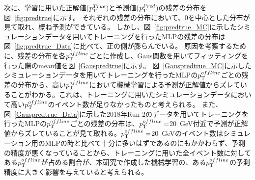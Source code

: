 次に、学習に用いた正解値($p_{\rm{T}}^{True}$)と予測値($p_{\rm{T}}^{Pred}$)の残差の分布を図~\ref{fig:predtrue}に示す。
それぞれの残差の分布において、0を中心とした分布が見て取れ、概ね予測ができている。
しかし、図~\ref{fig:predtrue_MC}に示したシミュレーションデータを用いてトレーニングを行ったMLPの残差の分布は図~\ref{fig:predtrue_Data}に比べて、正の側が膨らんでいる。
原因を考察するために、残差の分布を各$p_{\rm{T}}^{offline}$ごとに作成し、Gaus関数を用いてフィッティングを行った際のmean値を図~\ref{Gauspredtrue}に示す。
図~\ref{Gauspredtrue_MC}に示したシミュレーションデータを用いてトレーニングを行ったMLPの$p_{\rm{T}}^{offline}$ごとの残差の分布から、高い$p_{\rm{T}}^{offline}$において機械学習による予測が正解値からズレていることがわかる。これは、トレーニングに用いたシミュレーションデータにおいて高い$p_{\rm{T}}^{offline}$のイベント数が足りなかったものと考えられる。
また、図~\ref{Gauspredtrue_Data}に示した2018年Run-2のデータを用いてトレーニングを行ったMLPの$p_{\rm{T}}^{offline}$ごとの残差の分布は、$p_{\rm{T}}^{offline}=$20~GeV付近で予測が正解値からズレていることが見て取れる。$p_{\rm{T}}^{offline}=$20~GeVのイベント数はシミュレーション用のMLPの時と比べて十分に多いはずであるのにもかかわらず、予測の精度が悪くなっていることから、トレーニングに用いた全イベント数に対してある$p_{\rm{T}}^{offline}$が占める割合が、本研究で作成した機械学習の、ある$p_{\rm{T}}^{offline}$の予測精度に大きく影響を与えていると考えられる。

